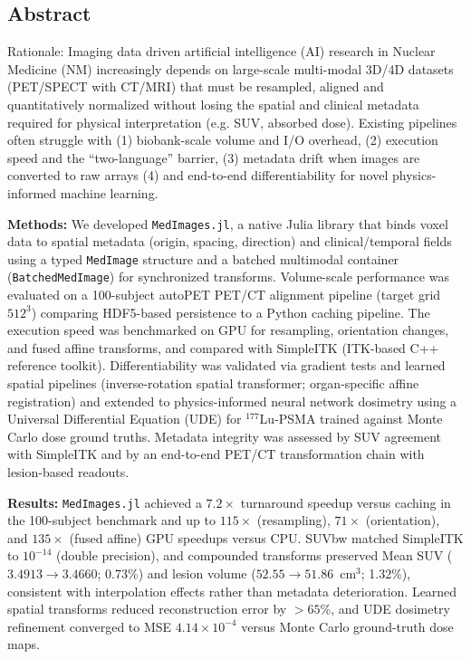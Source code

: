 \documentclass[a4paper,10pt]{elsarticle}
\begin{document}
\subsection*{Abstract}

Rationale: Imaging data driven artificial intelligence  (AI) research in Nuclear Medicine (NM) increasingly depends on large-scale multi-modal 3D/4D datasets (PET/SPECT with CT/MRI) that must be resampled, aligned and quantitatively normalized without losing the spatial and clinical metadata required for physical interpretation (e.g. SUV, absorbed dose). Existing pipelines often struggle with (1) biobank-scale volume and I/O overhead, (2) execution speed and the ``two-language'' barrier, (3) metadata drift when images are converted to raw arrays (4) and end-to-end differentiability for novel physics-informed machine learning.

\textbf{Methods:} We developed \texttt{MedImages.jl}, a native Julia library that binds voxel data to spatial metadata (origin, spacing, direction) and clinical/temporal fields using a typed \texttt{MedImage} structure and a batched multimodal container (\texttt{BatchedMedImage}) for synchronized transforms. Volume-scale performance was evaluated on a 100-subject autoPET PET/CT alignment pipeline (target grid $512^3$) comparing HDF5-based persistence to a Python caching pipeline. The execution speed was benchmarked on GPU for resampling, orientation changes, and fused affine transforms, and compared with SimpleITK (ITK-based C++ reference toolkit). Differentiability was validated via gradient tests and learned spatial pipelines (inverse-rotation spatial transformer; organ-specific affine registration) and extended to physics-informed neural network dosimetry using a Universal Differential Equation (UDE) for $^{177}$Lu-PSMA trained against Monte Carlo dose ground truths. Metadata integrity was assessed by SUV agreement with SimpleITK and by an end-to-end PET/CT transformation chain with lesion-based readouts.

\textbf{Results:} \texttt{MedImages.jl} achieved a $7.2\times$ turnaround speedup versus caching in the 100-subject benchmark and up to $115\times$ (resampling), $71\times$ (orientation), and $135\times$ (fused affine) GPU speedups versus CPU. SUVbw matched SimpleITK to $10^{-14}$ (double precision), and compounded transforms preserved Mean SUV ($3.4913 \rightarrow 3.4660$; 0.73\%) and lesion volume ($52.55 \rightarrow 51.86$~cm$^3$; 1.32\%), consistent with interpolation effects rather than metadata deterioration. Learned spatial transforms reduced reconstruction error by $>65$\%, and UDE dosimetry refinement converged to MSE $4.14\times10^{-4}$ versus Monte Carlo ground-truth dose maps.
\end{document}
